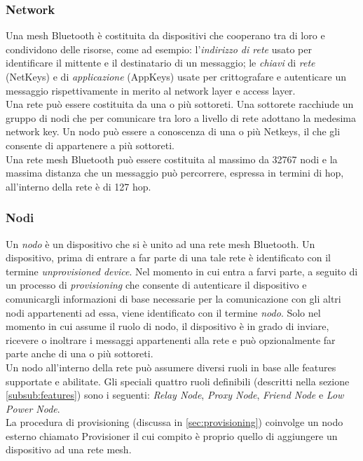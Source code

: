 \subsubsection{Network}
\label{subsub:network}
Una mesh Bluetooth è costituita da dispositivi che cooperano tra di loro e condividono delle risorse, come ad esempio: 
l'\textit{indirizzo di rete} usato per identificare il mittente e il destinatario di un messaggio; %
le \textit{chiavi} di \textit{rete} (NetKeys) e di \textit{applicazione} (AppKeys) usate per crittografare e autenticare un messaggio rispettivamente in merito al network layer e access layer.\\ %
Una rete può essere costituita da una o più sottoreti. Una sottorete racchiude un gruppo di nodi che per comunicare tra loro a livello di rete adottano la medesima network key. Un nodo può essere a conoscenza di una o più Netkeys, il che gli consente di appartenere a più sottoreti.\\
Una rete mesh Bluetooth può essere costituita al massimo da 32767 nodi e la massima distanza che un messaggio può percorrere, espressa in termini di hop, all'interno della rete è di 127 hop.

\subsubsection{Nodi}
\label{subsub:nodi}
Un \textit{nodo} è un dispositivo che si è unito ad una rete mesh Bluetooth. Un dispositivo, prima di entrare a far parte di una tale rete è identificato con il termine \textit{unprovisioned device}. Nel momento in cui entra a farvi parte, a seguito di un processo di \textit{provisioning} che consente di autenticare il dispositivo e comunicargli informazioni di base necessarie per la comunicazione con gli altri nodi appartenenti ad essa, viene identificato con il termine \textit{nodo}. Solo nel momento in cui assume il ruolo di nodo, il dispositivo è in grado di inviare, ricevere o inoltrare i messaggi appartenenti alla rete e può opzionalmente far parte anche di una o più sottoreti.\\
Un nodo all'interno della rete può assumere diversi ruoli in base alle features supportate e abilitate. Gli speciali quattro ruoli definibili (descritti nella sezione \ref{subsub:features}) sono i seguenti: \textit{Relay Node}, \textit{Proxy Node}, \textit{Friend Node} e \textit{Low Power Node}. \\
La procedura di provisioning (discussa in \ref{sec:provisioning}) coinvolge un nodo esterno chiamato Provisioner il cui compito è proprio quello di aggiungere un dispositivo ad una rete mesh.

